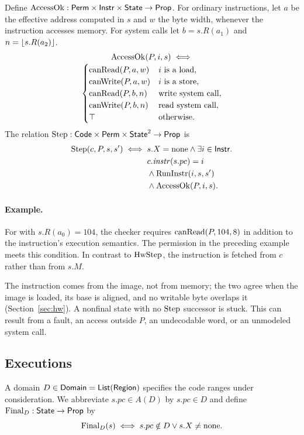 \begin{definition}\label{def:step}
Define $\mathrm{AccessOk}:\mathsf{Perm}\times\mathsf{Instr}\times\mathsf{State}\to\mathsf{Prop}$. For ordinary instructions, let $a$ be the effective address computed in $s$ and $w$ the byte width, whenever the instruction accesses memory. For system calls let $b=s.R(a_1)$ and $n=\lfloor s.R(a_2)\rfloor$.
\[
\begin{gathered}\mathrm{AccessOk}(P,i,s)\iff\\[-2pt]\begin{cases}
\mathrm{canRead}(P,a,w)&i\text{ is a load},\\
\mathrm{canWrite}(P,a,w)&i\text{ is a store},\\
\mathrm{canRead}(P,b,n)&\text{write system call},\\
\mathrm{canWrite}(P,b,n)&\text{read system call},\\
\top&\text{otherwise}.\end{cases}\end{gathered}
\]
The relation $\mathrm{Step}:\mathsf{Code}\times\mathsf{Perm}\times\mathsf{State}^2\to\mathsf{Prop}$ is
\[
\begin{aligned}
\mathrm{Step}(c,P,s,s')\iff{}&s.X=\mathrm{none}\land\exists i\in\mathsf{Instr}.\\
 &c.\mathit{instr}(s.pc)=i\\ &\land\mathrm{RunInstr}(i,s,s')\\ &\land\mathrm{AccessOk}(P,i,s).
\end{aligned}
\]
\end{definition}

\paragraph{Example.} For  with $s.R(a_0)=104$, the checker requires $\mathrm{canRead}(P,104,8)$ in addition to the instruction's execution semantics. The permission in the preceding example meets this condition. In contrast to $\mathrm{HwStep}$, the instruction is fetched from $c$ rather than from $s.M$.


The instruction comes from the image, not from memory; the two agree when the image is loaded, its base is aligned, and no writable byte overlaps it (Section~\ref{sec:hw}). A nonfinal state with no $\mathrm{Step}$ successor is stuck. This can result from a fault, an access outside $P$, an undecodable word, or an unmodeled system call.

\subsection{Executions}
A domain $D\in\mathsf{Domain}=\mathsf{List}(\mathsf{Region})$ specifies the code ranges under consideration. We abbreviate $s.pc\in A(D)$ by $s.pc\in D$ and define $\mathrm{Final}_D:\mathsf{State}\to\mathsf{Prop}$ by
\[\mathrm{Final}_D(s)\iff s.pc\notin D\lor s.X\ne\mathrm{none}.\]

